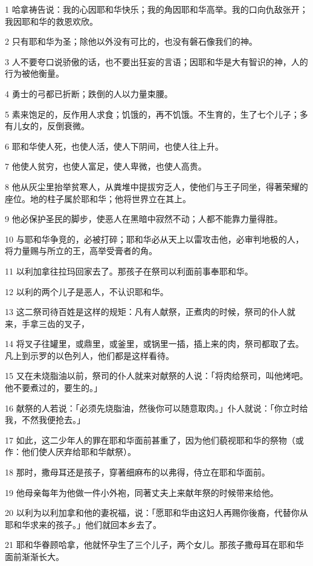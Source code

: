 \par 1 哈拿祷告说：我的心因耶和华快乐；我的角因耶和华高举。我的口向仇敌张开；我因耶和华的救恩欢欣。
\par 2 只有耶和华为圣；除他以外没有可比的，也没有磐石像我们的神。
\par 3 人不要夸口说骄傲的话，也不要出狂妄的言语；因耶和华是大有智识的神，人的行为被他衡量。
\par 4 勇士的弓都已折断；跌倒的人以力量束腰。
\par 5 素来饱足的，反作用人求食；饥饿的，再不饥饿。不生育的，生了七个儿子；多有儿女的，反倒衰微。
\par 6 耶和华使人死，也使人活，使人下阴间，也使人往上升。
\par 7 他使人贫穷，也使人富足，使人卑微，也使人高贵。
\par 8 他从灰尘里抬举贫寒人，从粪堆中提拔穷乏人，使他们与王子同坐，得著荣耀的座位。地的柱子属於耶和华；他将世界立在其上。
\par 9 他必保护圣民的脚步，使恶人在黑暗中寂然不动；人都不能靠力量得胜。
\par 10 与耶和华争竞的，必被打碎；耶和华必从天上以雷攻击他，必审判地极的人，将力量赐与所立的王，高举受膏者的角。
\par 11 以利加拿往拉玛回家去了。那孩子在祭司以利面前事奉耶和华。
\par 12 以利的两个儿子是恶人，不认识耶和华。
\par 13 这二祭司待百姓是这样的规矩：凡有人献祭，正煮肉的时候，祭司的仆人就来，手拿三齿的叉子，
\par 14 将叉子往罐里，或鼎里，或釜里，或锅里一插，插上来的肉，祭司都取了去。凡上到示罗的以色列人，他们都是这样看待。
\par 15 又在未烧脂油以前，祭司的仆人就来对献祭的人说：「将肉给祭司，叫他烤吧。他不要煮过的，要生的。」
\par 16 献祭的人若说：「必须先烧脂油，然後你可以随意取肉。」仆人就说：「你立时给我，不然我便抢去。」
\par 17 如此，这二少年人的罪在耶和华面前甚重了，因为他们藐视耶和华的祭物（或作：他们使人厌弃给耶和华献祭）。
\par 18 那时，撒母耳还是孩子，穿著细麻布的以弗得，侍立在耶和华面前。
\par 19 他母亲每年为他做一件小外袍，同著丈夫上来献年祭的时候带来给他。
\par 20 以利为以利加拿和他的妻祝福，说：「愿耶和华由这妇人再赐你後裔，代替你从耶和华求来的孩子。」他们就回本乡去了。
\par 21 耶和华眷顾哈拿，他就怀孕生了三个儿子，两个女儿。那孩子撒母耳在耶和华面前渐渐长大。
